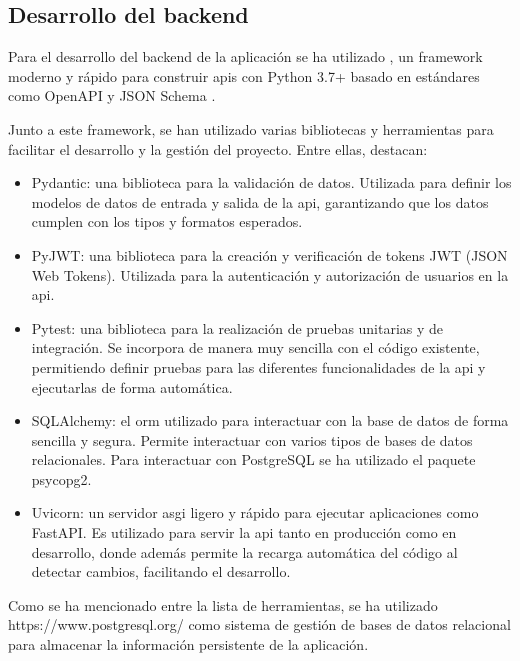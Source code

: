 \subsection{Desarrollo del \Gls{backend}}
\label{sec:desarrollo-api}
Para el desarrollo del \gls{backend} de la aplicación se ha utilizado
, un \gls{framework} moderno y
rápido para construir \glspl{api} con Python 3.7+ basado en estándares como
OpenAPI y JSON Schema \parencite{fastapi}.

Junto a este \gls{framework}, se han utilizado varias bibliotecas y herramientas
para facilitar el desarrollo y la gestión del proyecto. Entre ellas, destacan:
\begin{itemize}
    \item Pydantic: una biblioteca para la validación de datos. Utilizada para
    definir los modelos de datos de entrada y salida de la \gls{api},
    garantizando que los datos cumplen con los tipos y formatos esperados.

    \item PyJWT: una biblioteca para la creación y verificación de tokens JWT
    (JSON Web Tokens).  Utilizada para la autenticación y autorización de
    usuarios en la \gls{api}.

    \item Pytest: una biblioteca para la realización de pruebas unitarias y de
    integración.  Se incorpora de manera muy sencilla con el código existente,
    permitiendo definir pruebas para las diferentes funcionalidades de la
    \gls{api} y ejecutarlas de forma automática.

    \item SQLAlchemy: el \gls{orm} utilizado para interactuar con la base de
    datos de forma sencilla y segura. Permite interactuar con varios tipos de
    bases de datos relacionales. Para interactuar con PostgreSQL se ha utilizado
    el paquete psycopg2.

    \item Uvicorn: un servidor \gls{asgi} ligero y rápido para ejecutar
    aplicaciones como FastAPI.  Es utilizado para servir la \gls{api} tanto en
    producción como en desarrollo, donde además permite la recarga automática
    del código al detectar cambios, facilitando el desarrollo.
\end{itemize}

Como se ha mencionado entre la lista de herramientas, se ha utilizado
 {https://www.postgresql.org/} como sistema de gestión de bases
de datos relacional para almacenar la información persistente de la aplicación.

